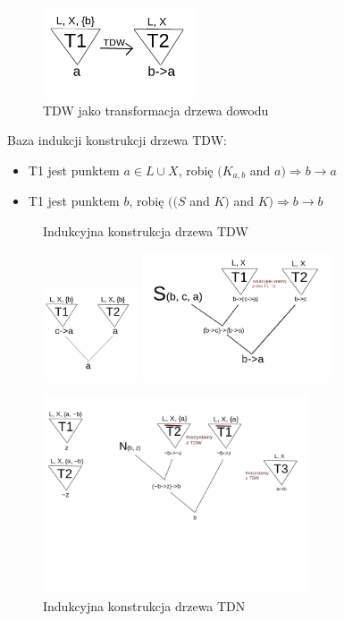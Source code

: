 \documentclass[10pt,a4paper]{article}
\theoremstyle{plain}
\theoremstyle{definition}
\begin{document}
\begin{figure}[h]
\caption{TDW jako transformacja drzewa dowodu}
\centering \includegraphics[width=0.4\textwidth]{img/drzewoTDW}
\end{figure}

Baza indukcji konstrukcji drzewa TDW:
\begin{itemize}
\item T1 jest punktem $a \in L \cup X$, robię $(K_{a, b}$ and $a) 
\Rightarrow b \rightarrow a$
\item T1 jest punktem $b$, robię $((S$ and $K)$ and $K) 
\Rightarrow b \rightarrow b$
\end{itemize}

\begin{figure}[h]
\caption{Indukcyjna konstrukcja drzewa TDW}
\centering \includegraphics[width=0.25\textwidth]{img/drzewoMP2}
\centering \includegraphics[width=0.5\textwidth]{img/drzewoTDWindukcyjnie}

\caption{Indukcyjna konstrukcja drzewa TDN}
\centering \includegraphics[width=0.7\textwidth]{img/drzewoTDN}
\end{figure}
\end{document}
